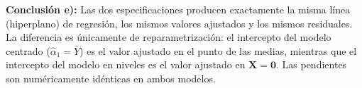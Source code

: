 \documentclass[12pt, letterpaper]{article}
\begin{document}
\begin{clave}
  \textbf{Conclusión e):} Las dos especificaciones producen exactamente
  la misma línea (hiperplano) de regresión, los mismos valores ajustados
  y los mismos residuales. La diferencia es únicamente de reparametrización:
  el intercepto del modelo centrado ($\hat{\alpha}_1 = \bar{Y}$) es el
  valor ajustado en el punto de las medias, mientras que el intercepto
  del modelo en niveles es el valor ajustado en $\mathbf{X} = \mathbf{0}$.
  Las pendientes son numéricamente idénticas en ambos modelos.
\end{clave}
\end{document}

